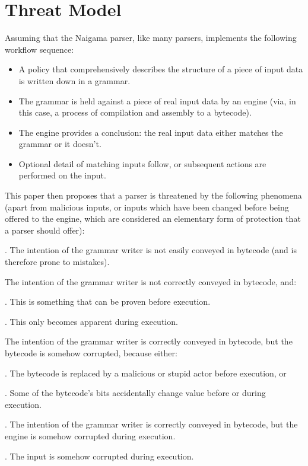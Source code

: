 \section{Threat Model}
Assuming that the Naigama parser, like many parsers, implements the
following workflow sequence:

\begin{itemize}
\item A policy that comprehensively describes the structure
      of a piece of input data is written down in a grammar.
\item The grammar is held against
      a piece of real input data by an engine (via, in this case,
      a process of compilation and assembly to a bytecode).
\item The engine provides a conclusion: the real
      input data either matches the grammar or it doesn't.
\item Optional detail of matching inputs follow, or subsequent actions
      are performed on the input.
\end{itemize}

This paper then proposes that a parser is threatened by the following phenomena
(apart from malicious inputs, or inputs which have been changed before being
offered to the engine, which are considered
an elementary form of protection that a parser should offer):

 \setcounter{threatintent}{\value{defctr}}
\thedefctr .
The intention of the grammar writer is not easily conveyed in bytecode
(and is therefore prone to mistakes).

The intention of the grammar writer is not correctly conveyed in
bytecode, and:

 \setcounter{threatbcerror}{\value{defctr}}
\thedefctr .
This is something that can be proven before execution.

 \setcounter{threatbcexec}{\value{defctr}}
\thedefctr .
This only becomes apparent during execution.

The intention of the grammar writer is correctly conveyed in bytecode,
but the bytecode is somehow corrupted, because either:

 \setcounter{threatbcsign}{\value{defctr}}
\thedefctr .
The bytecode is replaced by a malicious or stupid actor before execution, or

 \setcounter{threatbcupset}{\value{defctr}}
\thedefctr .
Some of the bytecode's bits accidentally change value before or
during execution.

 \setcounter{threatengine}{\value{defctr}}
\thedefctr .
The intention of the grammar writer is correctly conveyed in bytecode,
but the engine is somehow corrupted during execution.

 \setcounter{threatinput}{\value{defctr}}
\thedefctr .
The input is somehow corrupted during execution.
